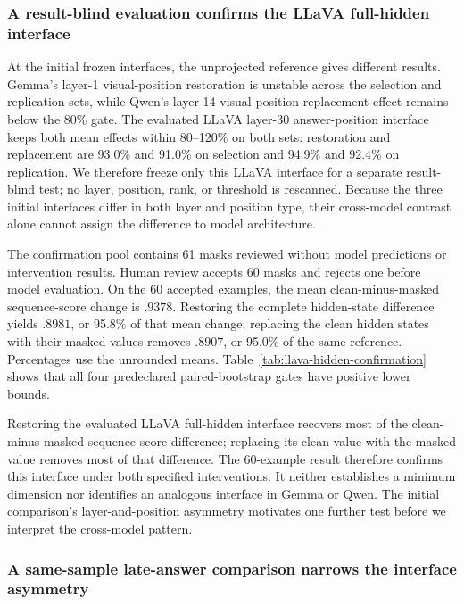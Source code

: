 \subsubsection{A result-blind evaluation confirms the LLaVA full-hidden interface}

At the initial frozen interfaces, the unprojected reference gives different results. Gemma's layer-1 visual-position restoration is unstable across the selection and replication sets, while Qwen's layer-14 visual-position replacement effect remains below the 80\% gate. The evaluated LLaVA layer-30 answer-position interface keeps both mean effects within 80--120\% on both sets: restoration and replacement are 93.0\% and 91.0\% on selection and 94.9\% and 92.4\% on replication. We therefore freeze only this LLaVA interface for a separate result-blind test; no layer, position, rank, or threshold is rescanned. Because the three initial interfaces differ in both layer and position type, their cross-model contrast alone cannot assign the difference to model architecture.

The confirmation pool contains 61 masks reviewed without model predictions or intervention results. Human review accepts 60 masks and rejects one before model evaluation. On the 60 accepted examples, the mean clean-minus-masked sequence-score change is $.9378$. Restoring the complete hidden-state difference yields $.8981$, or 95.8\% of that mean change; replacing the clean hidden states with their masked values removes $.8907$, or 95.0\% of the same reference. Percentages use the unrounded means. Table~\ref{tab:llava-hidden-confirmation} shows that all four predeclared paired-bootstrap gates have positive lower bounds.



Restoring the evaluated LLaVA full-hidden interface recovers most of the clean-minus-masked sequence-score difference; replacing its clean value with the masked value removes most of that difference. The 60-example result therefore confirms this interface under both specified interventions. It neither establishes a minimum dimension nor identifies an analogous interface in Gemma or Qwen. The initial comparison's layer-and-position asymmetry motivates one further test before we interpret the cross-model pattern.

\subsubsection{A same-sample late-answer comparison narrows the interface asymmetry}


